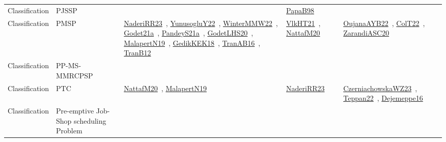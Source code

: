 {\begin{longtable}{lp{3cm}>{\raggedright\arraybackslash}p{6cm}>{\raggedright\arraybackslash}p{6cm}>{\raggedright\arraybackslash}p{8cm}}
Classification & PJSSP &  & \href{works/PapaB98.pdf}{PapaB98}~\cite{PapaB98} & \\
Classification & PMSP & \href{works/NaderiRR23.pdf}{NaderiRR23}~\cite{NaderiRR23}, \href{works/YunusogluY22.pdf}{YunusogluY22}~\cite{YunusogluY22}, \href{works/WinterMMW22.pdf}{WinterMMW22}~\cite{WinterMMW22}, \href{works/Godet21a.pdf}{Godet21a}~\cite{Godet21a}, \href{works/PandeyS21a.pdf}{PandeyS21a}~\cite{PandeyS21a}, \href{works/GodetLHS20.pdf}{GodetLHS20}~\cite{GodetLHS20}, \href{works/MalapertN19.pdf}{MalapertN19}~\cite{MalapertN19}, \href{works/GedikKEK18.pdf}{GedikKEK18}~\cite{GedikKEK18}, \href{works/TranAB16.pdf}{TranAB16}~\cite{TranAB16}, \href{works/TranB12.pdf}{TranB12}~\cite{TranB12} & \href{works/VlkHT21.pdf}{VlkHT21}~\cite{VlkHT21}, \href{works/NattafM20.pdf}{NattafM20}~\cite{NattafM20} & \href{works/OujanaAYB22.pdf}{OujanaAYB22}~\cite{OujanaAYB22}, \href{works/ColT22.pdf}{ColT22}~\cite{ColT22}, \href{works/ZarandiASC20.pdf}{ZarandiASC20}~\cite{ZarandiASC20}\\
Classification & PP-MS-MMRCPSP &  &  & \\
Classification & PTC & \href{works/NattafM20.pdf}{NattafM20}~\cite{NattafM20}, \href{works/MalapertN19.pdf}{MalapertN19}~\cite{MalapertN19} & \href{works/NaderiRR23.pdf}{NaderiRR23}~\cite{NaderiRR23} & \href{works/CzerniachowskaWZ23.pdf}{CzerniachowskaWZ23}~\cite{CzerniachowskaWZ23}, \href{works/Teppan22.pdf}{Teppan22}~\cite{Teppan22}, \href{works/Dejemeppe16.pdf}{Dejemeppe16}~\cite{Dejemeppe16}\\
Classification & Pre-emptive Job-Shop scheduling Problem &  &  & \\

\end{longtable}}
